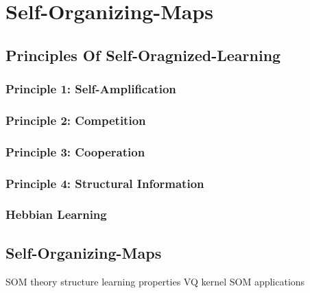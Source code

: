 \section{Self-Organizing-Maps}
\label{sect:self-organizing-maps}


\subsection{Principles Of Self-Oragnized-Learning}
\label{ssect:principles-of-self-organized-learning}


\subsubsection{Principle 1: Self-Amplification}
\label{sssect:principle1-self-amplification}


\subsubsection{Principle 2: Competition}
\label{sssect:principle2:competition}


\subsubsection{Principle 3: Cooperation}
\label{sssect:principle3:cooperation}


\subsubsection{Principle 4: Structural Information}
\label{sssect:principle4:structural-information}


\subsubsection{Hebbian Learning}
\label{sssect:hebbian-learning}


\subsection{Self-Organizing-Maps}
\label{ssect:self-organizing-maps}


SOM
	theory
	structure
	learning
	properties
		VQ
	kernel SOM
	applications
	
\newpage